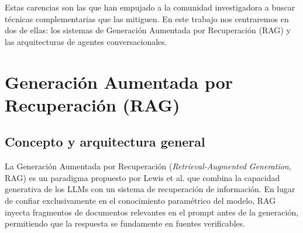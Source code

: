 \documentclass[12pt,a4paper,oneside]{report}
\begin{document}
Estas carencias son las que han empujado a la comunidad investigadora a buscar técnicas complementarias que las mitiguen. En este trabajo nos centraremos en dos de ellas: los sistemas de Generación Aumentada por Recuperación (RAG) y las arquitecturas de agentes conversacionales.

\section{Generación Aumentada por Recuperación (RAG)}
\subsection{Concepto y arquitectura general}

La Generación Aumentada por Recuperación (\textit{Retrieval-Augmented Generation}, RAG) es un paradigma propuesto por Lewis et al. \cite{lewis2020} que combina la capacidad generativa de los LLMs con un sistema de recuperación de información. En lugar de confiar exclusivamente en el conocimiento paramétrico del modelo, RAG inyecta fragmentos de documentos relevantes en el prompt antes de la generación, permitiendo que la respuesta se fundamente en fuentes verificables.
\end{document}
